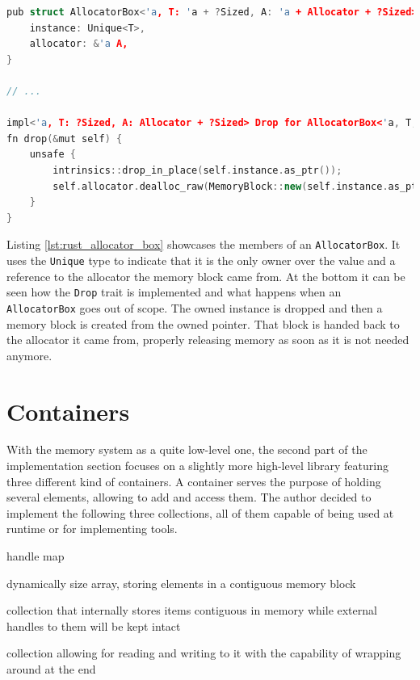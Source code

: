 \begin{lstlisting}[caption={AllocatorBox abstraction to allow \ac{RAII} management of allocations.}, label={lst:rust_allocator_box}, language={C++}]
pub struct AllocatorBox<'a, T: 'a + ?Sized, A: 'a + Allocator + ?Sized> {
	instance: Unique<T>,
	allocator: &'a A,
}

// ...

impl<'a, T: ?Sized, A: Allocator + ?Sized> Drop for AllocatorBox<'a, T, A> {
fn drop(&mut self) {
	unsafe {
		intrinsics::drop_in_place(self.instance.as_ptr());
		self.allocator.dealloc_raw(MemoryBlock::new(self.instance.as_ptr() as *mut u8));
	}
}

\end{lstlisting}

\noindent
Listing \ref{lst:rust_allocator_box} showcases the members of an \texttt{AllocatorBox}. It uses the \texttt{Unique} type to indicate that it is the only owner over the value and a reference to the allocator the memory block came from. At the bottom it can be seen how the \texttt{Drop} trait is implemented and what happens when an \texttt{AllocatorBox} goes out of scope. The owned instance is dropped and then a memory block is created from the owned pointer. That block is handed back to the allocator it came from, properly releasing memory as soon as it is not needed anymore. 

\newpage

\section{Containers} \label{container_impl}

With the memory system as a quite low-level one, the second part of the implementation section focuses on a slightly more high-level library featuring three different kind of containers. A container serves the purpose of holding several elements, allowing to add and access them. The author decided to implement the following three collections, all of them capable of being used at runtime or for implementing tools.

\begin{labeling}{handle map}
	\item [vector] dynamically size array, storing elements in a contiguous memory block
	\item [handle map] collection that internally stores items contiguous in memory 
	while external handles to them will be kept intact
	\item [ringbuffer] collection allowing for reading and writing to it
	with the capability of wrapping around at the end
\end{labeling}

